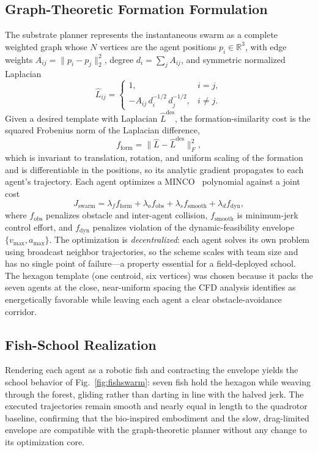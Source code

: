 \documentclass[journal]{IEEEtran}
\begin{document}
\subsection{Graph-Theoretic Formation Formulation}
The substrate planner represents the instantaneous swarm as a complete weighted
graph whose $N$ vertices are the agent positions $p_i\in\mathbb{R}^3$, with edge
weights $A_{ij}=\lVert p_i-p_j\rVert_2^2$, degree $d_i=\sum_j A_{ij}$, and
symmetric normalized Laplacian
\begin{equation}
\hat{L}_{ij}=
\begin{cases}
1, & i=j,\\[2pt]
-A_{ij}\,d_i^{-1/2}\,d_j^{-1/2}, & i\neq j .
\end{cases}
\end{equation}
Given a desired template with Laplacian $\hat{L}^{\mathrm{des}}$, the
formation-similarity cost is the squared Frobenius norm of the Laplacian
difference,
\begin{equation}
f_{\mathrm{form}}=\big\lVert\hat{L}-\hat{L}^{\mathrm{des}}\big\rVert_F^2 ,
\label{eq:fform}
\end{equation}
which is invariant to translation, rotation, and uniform scaling of the formation
and is differentiable in the positions, so its analytic gradient propagates to
each agent's trajectory. Each agent optimizes a
MINCO~\cite{wang2022geometrically} polynomial against a joint cost
\begin{equation}
J_{\mathrm{swarm}} = \lambda_f f_{\mathrm{form}} + \lambda_o f_{\mathrm{obs}}
  + \lambda_s f_{\mathrm{smooth}} + \lambda_d f_{\mathrm{dyn}},
\label{eq:Jswarm}
\end{equation}
where $f_{\mathrm{obs}}$ penalizes obstacle and inter-agent collision,
$f_{\mathrm{smooth}}$ is minimum-jerk control effort, and $f_{\mathrm{dyn}}$
penalizes violation of the dynamic-feasibility envelope $\{v_{\max},a_{\max}\}$.
The optimization is \emph{decentralized}: each agent solves its own problem using
broadcast neighbor trajectories, so the scheme scales with team size and has no
single point of failure---a property essential for a field-deployed school. The
hexagon template (one centroid, six vertices) was chosen because it packs the
seven agents at the close, near-uniform spacing the CFD analysis identifies as
energetically favorable while leaving each agent a clear obstacle-avoidance
corridor.

\subsection{Fish-School Realization}
Rendering each agent as a robotic fish and contracting the envelope yields the
school behavior of Fig.~\ref{fig:fishswarm}: seven fish hold the hexagon while
weaving through the forest, gliding rather than darting in line with the halved
jerk. The executed trajectories remain smooth and nearly equal in length to the
quadrotor baseline, confirming that the bio-inspired embodiment and the slow,
drag-limited envelope are compatible with the graph-theoretic planner without any
change to its optimization core.
\end{document}
